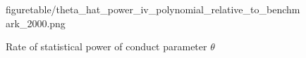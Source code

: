 \documentclass[11pt, a4paper]{article}
\begin{document}
\begin{figure}[!ht]
\begin{center}
{  {figuretable/theta_hat_power_iv_polynomial_relative_to_benchmark_2000.png}}
  \caption{Rate of statistical power of conduct parameter $\theta$}
  \label{fg:theta_hat_power_iv_polynomial_relative_to_benchmark}
  \end{center}
\end{figure} 
\end{document}
